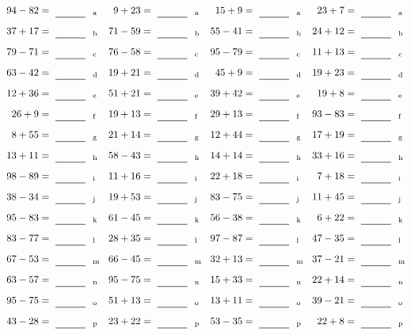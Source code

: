 \documentclass
[
  draft    = true,
  fontsize = 11pt,
  parskip  = half-
]
{scrartcl}
\begin{document}
\clearpage
\begin{align*}
    \pline{94-82}&=\rline{a}
  & \pline{9+23}&=\rline{a}
  & \pline{15+9}&=\rline{a}
  & \pline{23+7}&=\rline{a} \\[1ex]
    \pline{37+17}&=\rline{b}
  & \pline{71-59}&=\rline{b}
  & \pline{55-41}&=\rline{b}
  & \pline{24+12}&=\rline{b} \\[1ex]
    \pline{79-71}&=\rline{c}
  & \pline{76-58}&=\rline{c}
  & \pline{95-79}&=\rline{c}
  & \pline{11+13}&=\rline{c} \\[1ex]
    \pline{63-42}&=\rline{d}
  & \pline{19+21}&=\rline{d}
  & \pline{45+9}&=\rline{d}
  & \pline{19+23}&=\rline{d} \\[1ex]
    \pline{12+36}&=\rline{e}
  & \pline{51+21}&=\rline{e}
  & \pline{39+42}&=\rline{e}
  & \pline{19+8}&=\rline{e} \\[1ex]
    \pline{26+9}&=\rline{f}
  & \pline{19+13}&=\rline{f}
  & \pline{29+13}&=\rline{f}
  & \pline{93-83}&=\rline{f} \\[1ex]
    \pline{8+55}&=\rline{g}
  & \pline{21+14}&=\rline{g}
  & \pline{12+44}&=\rline{g}
  & \pline{17+19}&=\rline{g} \\[1ex]
    \pline{13+11}&=\rline{h}
  & \pline{58-43}&=\rline{h}
  & \pline{14+14}&=\rline{h}
  & \pline{33+16}&=\rline{h} \\[1ex]
    \pline{98-89}&=\rline{i}
  & \pline{11+16}&=\rline{i}
  & \pline{22+18}&=\rline{i}
  & \pline{7+18}&=\rline{i} \\[1ex]
    \pline{38-34}&=\rline{j}
  & \pline{19+53}&=\rline{j}
  & \pline{83-75}&=\rline{j}
  & \pline{11+45}&=\rline{j} \\[1ex]
    \pline{95-83}&=\rline{k}
  & \pline{61-45}&=\rline{k}
  & \pline{56-38}&=\rline{k}
  & \pline{6+22}&=\rline{k} \\[1ex]
    \pline{83-77}&=\rline{l}
  & \pline{28+35}&=\rline{l}
  & \pline{97-87}&=\rline{l}
  & \pline{47-35}&=\rline{l} \\[1ex]
    \pline{67-53}&=\rline{m}
  & \pline{66-45}&=\rline{m}
  & \pline{32+13}&=\rline{m}
  & \pline{37-21}&=\rline{m} \\[1ex]
    \pline{63-57}&=\rline{n}
  & \pline{95-75}&=\rline{n}
  & \pline{15+33}&=\rline{n}
  & \pline{22+14}&=\rline{n} \\[1ex]
    \pline{95-75}&=\rline{o}
  & \pline{51+13}&=\rline{o}
  & \pline{13+11}&=\rline{o}
  & \pline{39-21}&=\rline{o} \\[1ex]
    \pline{43-28}&=\rline{p}
  & \pline{23+22}&=\rline{p}
  & \pline{53-35}&=\rline{p}
  & \pline{22+8}&=\rline{p}
\end{align*}
\end{document}
